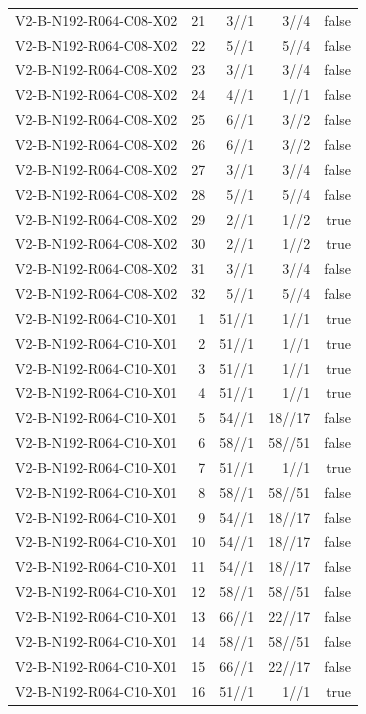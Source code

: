 {\begin{longtable}{lrrrr}
V2-B-N192-R064-C08-X02 & 21 & 3//1 & 3//4 & false \\
V2-B-N192-R064-C08-X02 & 22 & 5//1 & 5//4 & false \\
V2-B-N192-R064-C08-X02 & 23 & 3//1 & 3//4 & false \\
V2-B-N192-R064-C08-X02 & 24 & 4//1 & 1//1 & false \\
V2-B-N192-R064-C08-X02 & 25 & 6//1 & 3//2 & false \\
V2-B-N192-R064-C08-X02 & 26 & 6//1 & 3//2 & false \\
V2-B-N192-R064-C08-X02 & 27 & 3//1 & 3//4 & false \\
V2-B-N192-R064-C08-X02 & 28 & 5//1 & 5//4 & false \\
V2-B-N192-R064-C08-X02 & 29 & 2//1 & 1//2 & true \\
V2-B-N192-R064-C08-X02 & 30 & 2//1 & 1//2 & true \\
V2-B-N192-R064-C08-X02 & 31 & 3//1 & 3//4 & false \\
V2-B-N192-R064-C08-X02 & 32 & 5//1 & 5//4 & false \\
V2-B-N192-R064-C10-X01 & 1 & 51//1 & 1//1 & true \\
V2-B-N192-R064-C10-X01 & 2 & 51//1 & 1//1 & true \\
V2-B-N192-R064-C10-X01 & 3 & 51//1 & 1//1 & true \\
V2-B-N192-R064-C10-X01 & 4 & 51//1 & 1//1 & true \\
V2-B-N192-R064-C10-X01 & 5 & 54//1 & 18//17 & false \\
V2-B-N192-R064-C10-X01 & 6 & 58//1 & 58//51 & false \\
V2-B-N192-R064-C10-X01 & 7 & 51//1 & 1//1 & true \\
V2-B-N192-R064-C10-X01 & 8 & 58//1 & 58//51 & false \\
V2-B-N192-R064-C10-X01 & 9 & 54//1 & 18//17 & false \\
V2-B-N192-R064-C10-X01 & 10 & 54//1 & 18//17 & false \\
V2-B-N192-R064-C10-X01 & 11 & 54//1 & 18//17 & false \\
V2-B-N192-R064-C10-X01 & 12 & 58//1 & 58//51 & false \\
V2-B-N192-R064-C10-X01 & 13 & 66//1 & 22//17 & false \\
V2-B-N192-R064-C10-X01 & 14 & 58//1 & 58//51 & false \\
V2-B-N192-R064-C10-X01 & 15 & 66//1 & 22//17 & false \\
V2-B-N192-R064-C10-X01 & 16 & 51//1 & 1//1 & true \\

\end{longtable}}
